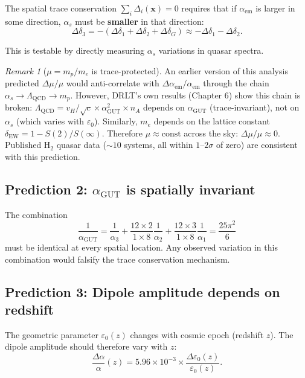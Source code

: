 \documentclass[12pt]{article}
\theoremstyle{remark}
\newtheorem{remark}[theorem]{Remark}
\begin{document}
The spatial trace conservation $\sum_i \Delta_i(\mathbf{x}) = 0$ requires that if $\alpha_\text{em}$ is larger in some direction, $\alpha_s$ must be \textbf{smaller} in that direction:
\begin{equation}
\Delta\delta_3 = -(\Delta\delta_1 + \Delta\delta_2 + \Delta\delta_G) \approx -\Delta\delta_1 - \Delta\delta_2.
\end{equation}

This is testable by directly measuring $\alpha_s$ variations in quasar spectra.

\begin{remark}[$\mu = m_p/m_e$ is trace-protected]
An earlier version of this analysis predicted $\Delta\mu/\mu$ would anti-correlate with $\Delta\alpha_\text{em}/\alpha_\text{em}$ through the chain $\alpha_s \to \Lambda_\text{QCD} \to m_p$. However, DRLT's own results (Chapter 6) show this chain is broken: $\Lambda_\text{QCD} = v_H/\sqrt{c} \times \alpha_\text{GUT}^2 \times n_A$ depends on $\alpha_\text{GUT}$ (trace-invariant), not on $\alpha_s$ (which varies with $\varepsilon_0$). Similarly, $m_e$ depends on the lattice constant $\delta_\text{EW} = 1 - S(2)/S(\infty)$. Therefore $\mu \approx \text{const}$ across the sky: $\Delta\mu/\mu \approx 0$. Published H$_2$ quasar data ($\sim 10$ systems, all within $1$--$2\sigma$ of zero) are consistent with this prediction.
\end{remark}

\subsection{Prediction 2: $\alpha_\text{GUT}$ is spatially invariant}

The combination
\begin{equation}
\frac{1}{\alpha_\text{GUT}} = \frac{1}{\alpha_3} + \frac{12 \times 2}{1 \times 8}\frac{1}{\alpha_2} + \frac{12 \times 3}{1 \times 8}\frac{1}{\alpha_1} = \frac{25\pi^2}{6}
\end{equation}
must be identical at every spatial location. Any observed variation in this combination would falsify the trace conservation mechanism.

\subsection{Prediction 3: Dipole amplitude depends on redshift}

The geometric parameter $\varepsilon_0(z)$ changes with cosmic epoch (redshift $z$). The dipole amplitude should therefore vary with $z$:
\begin{equation}
\frac{\Delta\alpha}{\alpha}(z) = 5.96 \times 10^{-3} \times \frac{\Delta\varepsilon_0(z)}{\varepsilon_0(z)}.
\end{equation}
\end{document}
